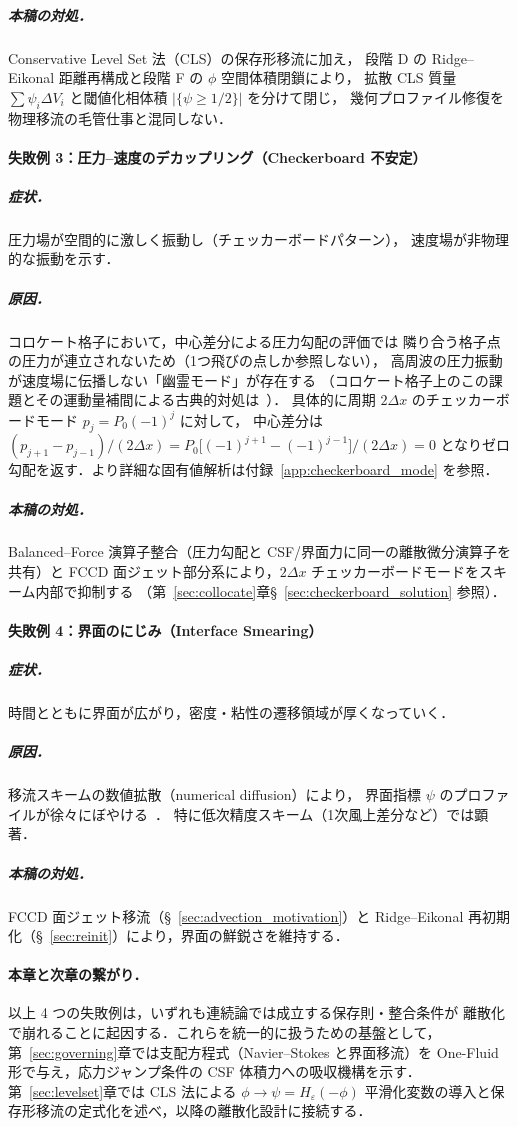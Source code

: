\subparagraph{本稿の対処．}Conservative Level Set 法（CLS）の保存形移流に加え，
段階 D の Ridge--Eikonal 距離再構成と段階 F の $\phi$ 空間体積閉鎖により，
拡散 CLS 質量 $\sum\psi_i\Delta V_i$ と閾値化相体積
$|\{\psi\ge 1/2\}|$ を分けて閉じ，
幾何プロファイル修復を物理移流の毛管仕事と混同しない．

\paragraph{失敗例 3：圧力--速度のデカップリング（Checkerboard 不安定）}
\subparagraph{症状．}圧力場が空間的に激しく振動し（チェッカーボードパターン），
速度場が非物理的な振動を示す．

\subparagraph{原因．}コロケート格子において，中心差分による圧力勾配の評価では
隣り合う格子点の圧力が連立されないため（1つ飛びの点しか参照しない），
高周波の圧力振動が速度場に伝播しない「幽霊モード」が存在する
（コロケート格子上のこの課題とその運動量補間による古典的対処は~\cite{RhieChow1983}）．
具体的に周期 $2\Delta x$ のチェッカーボードモード $p_j = P_0(-1)^j$ に対して，
中心差分は
$(p_{j+1}-p_{j-1})/(2\Delta x) = P_0\bigl[(-1)^{j+1}-(-1)^{j-1}\bigr]/(2\Delta x) = 0$
となりゼロ勾配を返す．より詳細な固有値解析は付録~\ref{app:checkerboard_mode} を参照．

\subparagraph{本稿の対処．} Balanced--Force 演算子整合（圧力勾配と CSF/界面力に同一の離散微分演算子を共有）と
FCCD 面ジェット部分系により，$2\Delta x$ チェッカーボードモードをスキーム内部で抑制する
（第~\ref{sec:collocate}章§~\ref{sec:checkerboard_solution} 参照）．

\paragraph{失敗例 4：界面のにじみ（Interface Smearing）}
\subparagraph{症状．}時間とともに界面が広がり，密度・粘性の遷移領域が厚くなっていく．

\subparagraph{原因．}移流スキームの数値拡散（numerical diffusion）により，
界面指標 $\psi$ のプロファイルが徐々にぼやける~\cite{OlssonKreiss2005}．
特に低次精度スキーム（1次風上差分など）では顕著．

\subparagraph{本稿の対処．}FCCD 面ジェット移流（§~\ref{sec:advection_motivation}）と
Ridge--Eikonal 再初期化（§~\ref{sec:reinit}）により，界面の鮮鋭さを維持する．

\paragraph{本章と次章の繋がり．}

以上 4 つの失敗例は，いずれも連続論では成立する保存則・整合条件が
離散化で崩れることに起因する．これらを統一的に扱うための基盤として，
第~\ref{sec:governing}章では支配方程式（Navier--Stokes と界面移流）を
One-Fluid 形で与え，応力ジャンプ条件の CSF 体積力への吸収機構を示す．
第~\ref{sec:levelset}章では CLS 法による $\phi \to \psi = H_\varepsilon(-\phi)$
平滑化変数の導入と保存形移流の定式化を述べ，以降の離散化設計に接続する．
